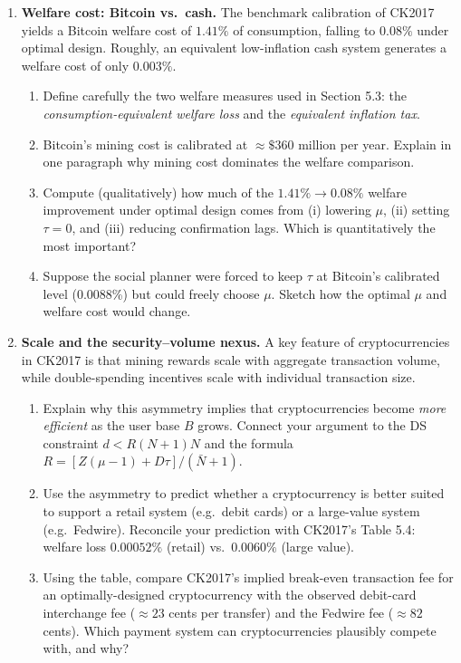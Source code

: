 \documentclass[11pt]{article}
\begin{document}
\begin{enumerate}
\item \textbf{Welfare cost: Bitcoin vs.\ cash.}
The benchmark calibration of CK2017 yields a Bitcoin welfare cost of $1.41\%$ of consumption,
falling to $0.08\%$ under optimal design. Roughly, an equivalent low-inflation cash system
generates a welfare cost of only $0.003\%$.
\begin{enumerate}
    \item Define carefully the two welfare measures used in Section 5.3: the
          \emph{consumption-equivalent welfare loss} and the \emph{equivalent inflation tax}.
    \item Bitcoin's mining cost is calibrated at $\approx \$360$ million per year. Explain
          in one paragraph why mining cost dominates the welfare comparison.
    \item Compute (qualitatively) how much of the $1.41\% \to 0.08\%$ welfare improvement under
          optimal design comes from (i) lowering $\mu$, (ii) setting $\tau=0$, and (iii) reducing
          confirmation lags. Which is quantitatively the most important?
    \item Suppose the social planner were forced to keep $\tau$ at Bitcoin's calibrated level
          (0.0088\%) but could freely choose $\mu$. Sketch how the optimal $\mu$ and welfare cost
          would change.
\end{enumerate}

\item \textbf{Scale and the security--volume nexus.}
A key feature of cryptocurrencies in CK2017 is that mining rewards scale with aggregate
transaction volume, while double-spending incentives scale with individual transaction size.
\begin{enumerate}
    \item Explain why this asymmetry implies that cryptocurrencies become \emph{more efficient}
          as the user base $B$ grows. Connect your argument to the DS constraint $d < R(N+1)N$
          and the formula $R = [Z(\mu-1) + D\tau]/(\bar N+1)$.
    \item Use the asymmetry to predict whether a cryptocurrency is better suited to support a
          retail system (e.g.\ debit cards) or a large-value system (e.g.\ Fedwire).
          Reconcile your prediction with CK2017's Table 5.4: welfare loss
          $0.00052\%$ (retail) vs.\ $0.0060\%$ (large value).
    \item Using the table, compare CK2017's implied break-even transaction fee for an
          optimally-designed cryptocurrency with the observed debit-card interchange fee
          ($\approx 23$ cents per transfer) and the Fedwire fee ($\approx 82$ cents).
          Which payment system can cryptocurrencies plausibly compete with, and why?
\end{enumerate}


\end{enumerate}
\end{document}
